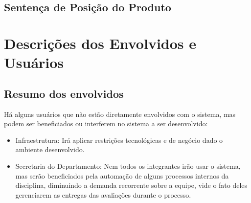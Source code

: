 \subsection{Sentença de Posição do Produto}

\begin{table}[!htb]
    \centering
    \caption{Sentença básica de posição do produto}
    \label{my-label}
\end{table}


\section{Descrições dos Envolvidos e Usuários}
\subsection{Resumo dos envolvidos}

Há alguns usuários que não estão diretamente envolvidos com o sistema, mas podem ser beneficiados ou interferem no sistema a ser desenvolvido:

\begin{itemize}
    \item Infraestrutura: Irá aplicar restrições tecnológicas e de negócio dado o ambiente desenvolvido.
    \item Secretaria do Departamento: Nem todos os integrantes irão usar o sistema, mas serão beneficiados pela automação de alguns processos internos da disciplina, diminuindo a demanda recorrente sobre a equipe, vide o fato deles gerenciarem as entregas das avaliações durante o processo.
\end{itemize}

